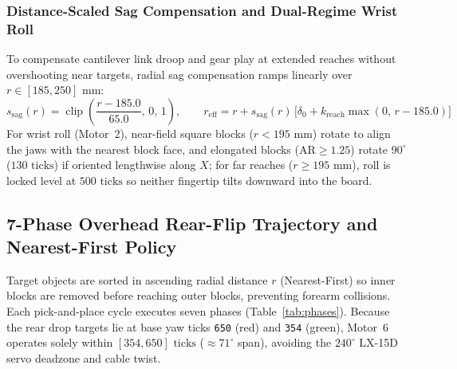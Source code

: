 \documentclass[11pt,a4paper]{article}
\begin{document}
\subsubsection*{Distance-Scaled Sag Compensation and Dual-Regime Wrist Roll}
To compensate cantilever link droop and gear play at extended reaches without overshooting near targets, radial sag compensation ramps linearly over $r \in [185, 250]\text{ mm}$:
\begin{equation}
  s_{\text{sag}}(r) = \operatorname{clip}\!\left(\frac{r - 185.0}{65.0},\, 0,\, 1\right), \qquad
  r_{\text{eff}} = r + s_{\text{sag}}(r)\,\big[\delta_0 + k_{\text{reach}}\max(0,\, r - 185.0)\big]
\end{equation}
For wrist roll (Motor~2), near-field square blocks ($r < 195\text{ mm}$) rotate to align the jaws with the nearest block face, and elongated blocks ($\text{AR} \ge 1.25$) rotate $90^\circ$ ($130\text{ ticks}$) if oriented lengthwise along $X$; for far reaches ($r \ge 195\text{ mm}$), roll is locked level at $500\text{ ticks}$ so neither fingertip tilts downward into the board.

\subsection{7-Phase Overhead Rear-Flip Trajectory and Nearest-First Policy}
Target objects are sorted in ascending radial distance $r$ (Nearest-First) so inner blocks are removed before reaching outer blocks, preventing forearm collisions. Each pick-and-place cycle executes seven phases (Table~\ref{tab:phases}). Because the rear drop targets lie at base yaw ticks \texttt{650} (red) and \texttt{354} (green), Motor~6 operates solely within $[354, 650]\text{ ticks}$ ($\approx 71^\circ$ span), avoiding the $240^\circ$ LX-15D servo deadzone and cable twist.
\end{document}
